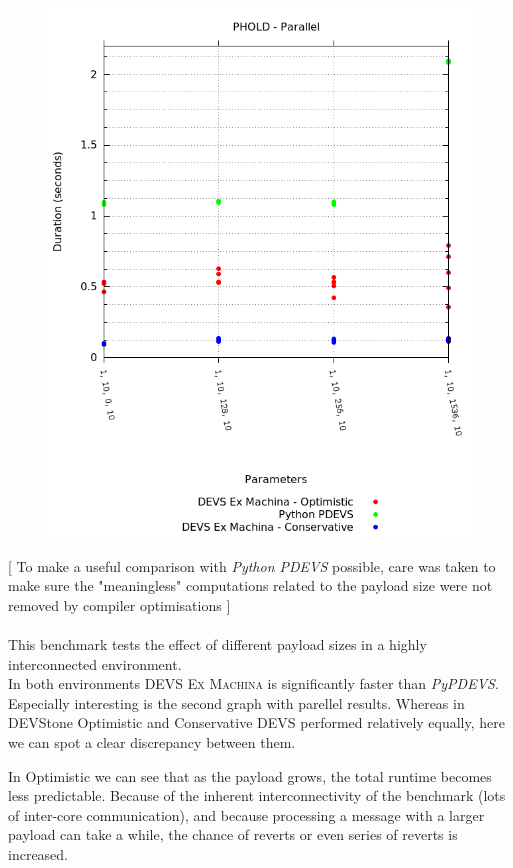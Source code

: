 \documentclass[8pt,a4paper]{report}
\begin{document}
\begin{figure}
\begin{minipage}{.5\textwidth}
  \includegraphics[width=1.6\linewidth]{phold_parallel.png}
\end{minipage}
\end{figure}

{\footnotesize[ To make a useful comparison with \textit{Python PDEVS} possible, care was taken to make sure the "meaningless" computations related to the payload size were not removed by compiler optimisations ]}\\
\\
This benchmark tests the effect of different payload sizes in a highly interconnected environment.\\
In both environments \textsc{DEVS Ex Machina} is significantly faster than \textit{PyPDEVS}.
Especially interesting is the second graph with parellel results. Whereas in DEVStone Optimistic and Conservative DEVS performed relatively equally, here we can spot a clear discrepancy between them.

In Optimistic we can see that as the payload grows, the total runtime becomes less predictable. Because of the inherent interconnectivity of the benchmark (lots of inter-core communication), and because processing a message with a larger payload can take a while, the chance of reverts or even series of reverts is increased.
\end{document}

